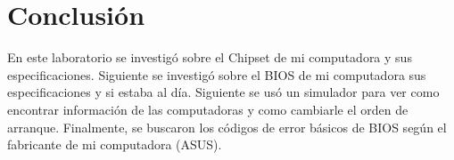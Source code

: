 \documentclass[stu, 12pt, letterpaper, donotrepeattitle, floatsintext, natbib, helv]{apa7}
\begin{document}
\section*{Conclusión}
{}
En este laboratorio se investigó sobre el Chipset de mi computadora y sus especificaciones. Siguiente se investigó sobre el BIOS de mi computadora sus especificaciones y si estaba al día. Siguiente se usó un simulador para ver como encontrar información de las computadoras y como cambiarle el orden de arranque. Finalmente, se buscaron los códigos de error básicos de BIOS según el fabricante de mi computadora (ASUS).

\newpage
\renewcommand\refname{\large\textbf{Referencias}}

\end{document}
